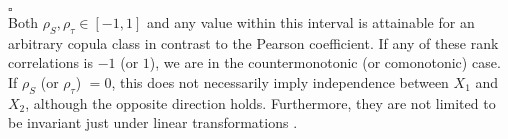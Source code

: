 \hfill $\square$ \\


Both $\rho_S, \rho_{\tau} \in [-1,1]$ and any value within this interval is attainable for an arbitrary copula class in contrast to the Pearson coefficient. 
If any of these rank correlations is $-1$ (or $1$), we are in the countermonotonic (or comonotonic) case. If $\rho_S$ (or $\rho_{\tau}$) $=0$, this does not necessarily imply independence between $X_1$ and $X_2$, although the opposite direction holds.
Furthermore, they are not limited to be invariant just under linear transformations . 










